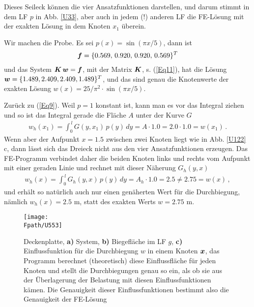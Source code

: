 Dieses Seileck k\"{o}nnen die vier Ansatzfunktionen darstellen, und darum stimmt in dem LF $p$ in Abb. \ref{U33}, aber auch in jedem (!) anderen LF die FE-L\"{o}sung mit der exakten L\"{o}sung in dem Knoten $x_1$ \"{u}berein.

Wir machen die Probe. Es sei $p(x) = \sin(\pi x/5)$, dann ist
\begin{align}
\mbox{\boldmath $f$} = \{0.569, \,0.920, \,0.920, \,0.569\}^T
\end{align}
und das System $\mbox{\boldmath $K$}\,\mbox{\boldmath $w$} = \mbox{\boldmath $f$}$, mit der Matrix $\mbox{\boldmath $K$}$, s. (\ref{Eq11}), hat die L\"{o}sung $\mbox{\boldmath $w$} = \{1.489, 2.409, 2.409, 1.489\}^T$, und das sind genau die Knotenwerte der exakten L\"{o}sung $w(x) = 25/\pi^2 \cdot \sin(\pi  x/5)$.

Zur\"{u}ck zu (\ref{Eq9}). Weil $p = 1$ konstant ist, kann man es vor das Integral ziehen und so ist das Integral gerade die Fl\"{a}che $A$ unter der Kurve $G$
\begin{align}
 w_h(x_1) = \int_0^{\,l} G(y,x_1)\,p(y)\,dy = A \cdot 1.0 = 2.0 \cdot 1.0 = w(x_1)\,.
\end{align}
Wenn aber der Aufpunkt $x = 1.5$ zwischen zwei Knoten liegt wie in Abb. \ref{U122} c, dann l\"{a}sst sich das Dreieck nicht aus den vier Ansatzfunktionen erzeugen. Das FE-Programm verbindet daher die beiden Knoten links und rechts vom Aufpunkt mit einer geraden Linie und rechnet mit dieser N\"{a}herung $G_h(y,x)$
\begin{align}
w_h(x) = \int_0^{\,l} G_h(y,x)\,p(y)\,dy = A_h \cdot 1.0 = 2.5 \neq 2.75 = w(x)\,,
\end{align}
und erh\"{a}lt so nat\"{u}rlich auch nur einen gen\"{a}herten Wert f\"{u}r die Durchbiegung, n\"{a}mlich $w_h(x) = 2.5$ m, statt des exakten Werts $w = 2.75$ m.
\begin{figure}[tbp] \centering
\centering
\if {} \sidecaption[t] \fi
\texttt{[image: \\Fpath/U553]}  %
\caption{Deckenplatte, \textbf{a)} System,  \textbf{ b)} Biegefl\"{a}che im LF $g$, \textbf{ c)} Einflussfunktion f\"{u}r die Durchbiegung $w$ in einem Knoten $\mbox{\boldmath $x$}$, das Programm berechnet (theoretisch) diese Einflussfl\"{a}che f\"{u}r jeden Knoten und stellt die Durchbiegungen genau so ein, als ob sie aus der \"{U}berlagerung der Belastung mit diesen Einflussfunktionen k\"{a}men. Die Genauigkeit dieser Einflussfunktionen bestimmt also die Genauigkeit der FE-L\"{o}sung } \label{U189}
\end{figure}%

